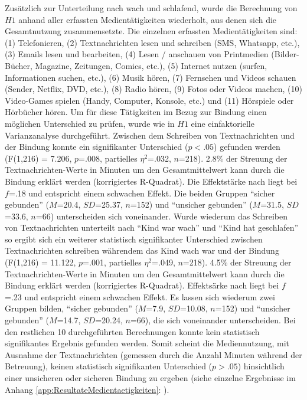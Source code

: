 Zusätzlich zur Unterteilung nach wach und schlafend, wurde die Berechnung von $H1$  anhand aller erfassten Medientätigkeiten wiederholt, aus denen sich die Gesamtnutzung zusammensetzte. Die einzelnen erfassten Medientätigkeiten sind: (1) Telefonieren,  (2) Textnachrichten lesen und schreiben (SMS, Whatsapp, etc.), (3) Emails lesen und bearbeiten, (4) Lesen / anschauen von Printmedien (Bilder-Bücher, Magazine, Zeitungen, Comics, etc.), (5) Internet nutzen (surfen, Informationen suchen, etc.), (6) Musik hören, (7) Fernsehen und Videos schauen (Sender, Netflix, DVD, etc.), (8) Radio hören, (9) Fotos oder Videos machen, (10) Video-Games spielen (Handy, Computer, Konsole, etc.) und (11) Hörspiele oder Hörbücher hören. Um für diese Tätigkeiten im Bezug zur Bindung einen möglichen Unterschied zu prüfen, wurde wie in $H1$ eine einfaktorielle Varianzanalyse durchgeführt. Zwischen dem Schreiben von Textnachrichten und der Bindung konnte ein signifikanter Unterschied ($p<.05$) gefunden werden (F(1,216) = 7.206, $p$=.008, partielles $\eta^2$=.032, $n$=218). 2.8\% der Streuung der Textnachrichten-Werte in Minuten um den Gesamtmittelwert kann durch die Bindung erklärt werden (korrigiertes R-Quadrat). Die Effektstärke nach  liegt bei $f$=.18 und entspricht einem schwachen Effekt. Die beiden Gruppen \enquote{sicher gebunden} ($M$=20.4, $SD$=25.37, $n$=152) und \enquote{unsicher gebunden} ($M$=31.5, $SD$=33.6, $n$=66) unterscheiden sich voneinander. Wurde wiederum das Schreiben von Textnachrichten unterteilt nach \enquote{Kind war wach} und \enquote{Kind hat geschlafen} so ergibt sich ein weiterer statistisch signifikanter Unterschied zwischen Textnachrichten schreiben währendem das Kind wach war und der Bindung (F(1,216) = 11.122, $p$=.001, partielles $\eta^2$=.049, $n$=218). 4.5\% der Streuung der Textnachrichten-Werte in Minuten um den Gesamtmittelwert kann durch die Bindung erklärt werden (korrigiertes R-Quadrat). Effektsärke nach  liegt bei $f$=.23 und entspricht einem schwachen Effekt. Es lassen sich wiederum zwei Gruppen bilden, \enquote{sicher gebunden} ($M$=7.9, $SD$=10.08, $n$=152) und \enquote{unsicher gebunden} ($M$=14.7, $SD$=20.24, $n$=66), die sich voneinander unterscheiden. Bei den restlichen  10 durchgeführten Berechnungen konnte kein statistisch signifikantes Ergebnis gefunden werden. Somit scheint die Mediennutzung, mit Ausnahme der Textnachrichten (gemessen durch die Anzahl Minuten während der Betreuung), keinen statistisch signifikanten Unterschied ($p>.05$) hinsichtlich einer unsicheren oder sicheren Bindung zu ergeben (siehe einzelne Ergebnisse im Anhang \ref{app:ResultateMedientaetigkeiten}: \textit{}).

